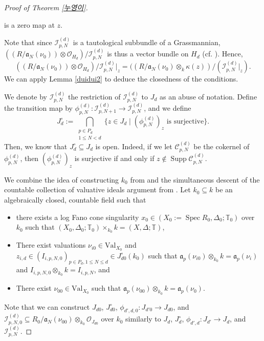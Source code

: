 \documentclass[a4paper,12pt]{amsart}
\theoremstyle{definition} %
\theoremstyle{remark}
\numberwithin{equation}{section}
\def\Spec{\operatorname{Spec}}
\def\Supp{\operatorname{Supp}}
\begin{document}
\begin{proof}[Proof of Theorem \ref{누영이}]
\begin{itemize}
    is a zero map at $z$.
\end{itemize}
Note that since $\mathcal{I}^{(d)}_{p,N}$ is a tautological subbundle of a Grassmannian, $((R/\mathfrak{a}_N(\nu_0))\otimes \mathcal{O}_{H_d})/\mathcal{I}^{(d)}_{p,N}$ is thus a vector bundle on $H_d$ (cf. \cite[Proposition 8.10 (iv) $\implies$ (ii)]{GW20}). Hence, 
$$ ((R/\mathfrak{a}_N(\nu_0))\otimes \mathcal{O}_{H_d})/\mathcal{I}^{(d)}_{p,N}|_z=((R/\mathfrak{a}_N(\nu_0)\otimes_k \kappa(z))/(\mathcal{I}^{(d)}_{p,N}|_z).$$
We can apply Lemma \ref{duidui2} to deduce the closedness of the conditions.

\smallskip

We denote by $\mathcal{I}^{(d)}_{p,N}$ the restriction of $\mathcal{I}^{(d)}_{p,N}$ to $J_d$ as an abuse of notation. Define the transition map by $\phi^{(d)}_{p,N}:\mathcal{I}^{(d)}_{p,N+1}\to \mathcal{I}^{(d)}_{p,N}$, and we define
$$ J^{\circ}_d:=\bigcap_{\substack{p\in P_d \\ 1\le N<d}}\{z\in J_d\mid (\phi^{(d)}_{p,N})_z\text{ is surjective}\}.$$
Then, we know that $J^{\circ}_d\subseteq J_d$ is open. Indeed, if we let $\mathcal{C}^{(d)}_{p,N}$ be the cokernel of $\phi^{(d)}_{p,N}$, then $(\phi^{(d)}_{p,N})_z$ is surjective if and only if $z\notin \Supp \mathcal{C}^{(d)}_{p,N}$.

\smallskip

We combine the idea of constructing $k_0$ from \cite[Proof of Theorem 4.1]{Tot12} and the simultaneous descent of the countable collection of valuative ideals argument from \cite[Proof of Proposition 3.9]{LX20}. Let $k_0\subseteq k$ be an algebraically closed, countable field such that
\begin{itemize}
    \item there exists a log Fano cone singularity $x_0\in (X_0:=\Spec R_0,\Delta_0;\mathbb{T}_0)$ over $k_0$ such that $(X_0,\Delta_0;\mathbb{T}_0)\times_{k_0}k=(X,\Delta;\mathbb{T})$,
    \item There exist valuations $\nu_{i0}\in \mathrm{Val}_{X_0}$ and $z_{i,d}\in \left(I_{i,p,N,0}\right)_{p\in P_d,1\le N\le d}\in J^{\circ}_{d0}(k_0)$ such that $\mathfrak{a}_{p}(\nu_{i0})\otimes_{k_0} k=\mathfrak{a}_{p}(\nu_i)$ and $I_{i,p,N,0}\otimes_{k_0}k=I_{i,p,N}$, and
    \item There exist $\nu_{00}\in \mathrm{Val}_{X_0}$ such that $\mathfrak{a}_p(\nu_{00})\otimes_{k_0}k=\mathfrak{a}_p(\nu_0)$.
\end{itemize}
Note that we can construct $J_{d0}$, $J^{\circ}_{d0}$, $\phi_{d',d,0}:J_{d'0}\to J_{d0}$, and $\mathcal{I}^{(d)}_{p,N,0}\subseteq R_{0}/\mathfrak{a}_N(\nu_{00})\otimes_{k_0}\mathcal{O}_{J_{d0}}$ over $k_0$ similarly to $J_{d}$, $J^{\circ}_{d}$, $\phi_{d',d}:J_{d'}\to J_{d}$, and $\mathcal{I}^{(d)}_{p,N}$.


\end{proof}
\end{document}
